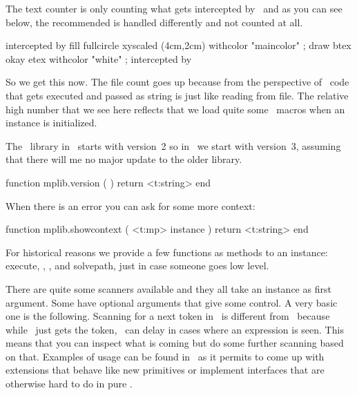 \starttworows
\stoptworows

The text counter is only counting what gets intercepted by \METAPOST\ and as you
can see below, the recommended  is handled differently and not
counted at all.

\startlinecorrection
{} {intercepted by \CONTEXT}
  {\startMPcode
      fill fullcircle xyscaled (4cm,2cm) withcolor "maincolor" ;
      draw btex okay etex withcolor "white" ;
   \stopMPcode} {intercepted by \METAPOST}
\stopcombination
\stoplinecorrection

So we get this now. The file count goes up because from the perspective of
\METAPOST\ code that gets executed and passed as string is just like reading from
file. The relative high number that we see here reflects that we load quite some
\METAFUN\ macros when an instance is initialized.

\startthreerows
\stopthreerows

\stopsection

\startsection[title=Information]

The \METAPOST\ library in \LUATEX\ starts with version~2 so in \LUAMETATEX\ we
start with version~3, assuming that there will me no major update to the older
library.

\starttyping[option=LUA]
function mplib.version ( )
    return <t:string>
end
\stoptyping

When there is an error you can ask for some more context:

\starttyping[option=LUA]
function mplib.showcontext ( <t:mp> instance )
    return <t:string>
end
\stoptyping

\stopsection

\startsection[title=Methods]

For historical reasons we provide a few functions as methods to an instance: \typ
{execute}, , ,  and \typ
{solvepath}, just in case someone goes low level.

\stopsection

\startsection[title=Scanners]

There are quite some scanners available and they all take an instance as first
argument. Some have optional arguments that give some control. A very basic one
is the following. Scanning for a next token in \METAPOST\ is different from \TEX\
because while \TEX\ just gets the token, \METAPOST\ can delay in cases where an
expression is seen. This means that you can inspect what is coming but do some
further scanning based on that. Examples of usage can be found in \CONTEXT\ as it
permits to come up with extensions that behave like new primitives or implement
interfaces that are otherwise hard to do in pure \METAPOST.

